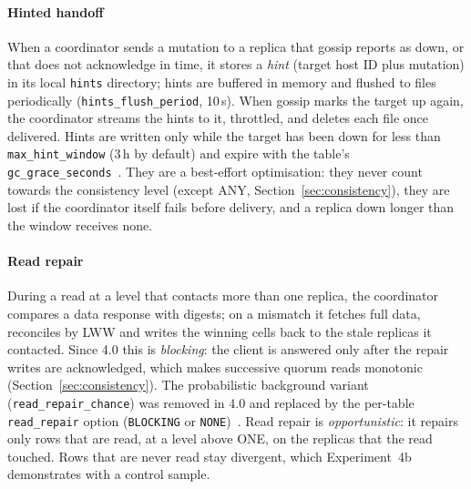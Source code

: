 \paragraph{Hinted handoff}
When a coordinator sends a mutation to a replica that gossip reports as down, or that does
not acknowledge in time, it stores a \emph{hint} (target host ID plus mutation) in its local
\texttt{hints} directory; hints are buffered in memory and flushed to files periodically
(\texttt{hints\_flush\_period}, 10\,s). When gossip marks the target up again, the
coordinator streams the hints to it, throttled, and deletes each file once delivered.
Hints are written only while the target has been down for less than
\texttt{max\_hint\_window} (3\,h by default) and expire with the table's
\texttt{gc\_grace\_seconds}~\cite{cassdoc-hints}. They are a best-effort optimisation:
they never count towards the consistency level (except ANY,
Section~\ref{sec:consistency}), they are lost if the coordinator itself fails before
delivery, and a replica down longer than the window receives none.

\paragraph{Read repair}
During a read at a level that contacts more than one replica, the coordinator compares a
data response with digests; on a mismatch it fetches full data, reconciles by LWW and
writes the winning cells back to the stale replicas it contacted. Since 4.0 this is
\emph{blocking}: the client is answered only after the repair writes are acknowledged, which
makes successive quorum reads monotonic (Section~\ref{sec:consistency}). The
probabilistic background variant (\texttt{read\_repair\_chance}) was removed in 4.0 and
replaced by the per-table \texttt{read\_repair} option (\texttt{BLOCKING} or
\texttt{NONE})~\cite{cassdoc-readrepair}. Read repair is \emph{opportunistic}: it repairs only
rows that are read, at a level above ONE, on the replicas that the read touched. Rows that are
never read stay divergent, which Experiment~4b demonstrates with a control sample.

